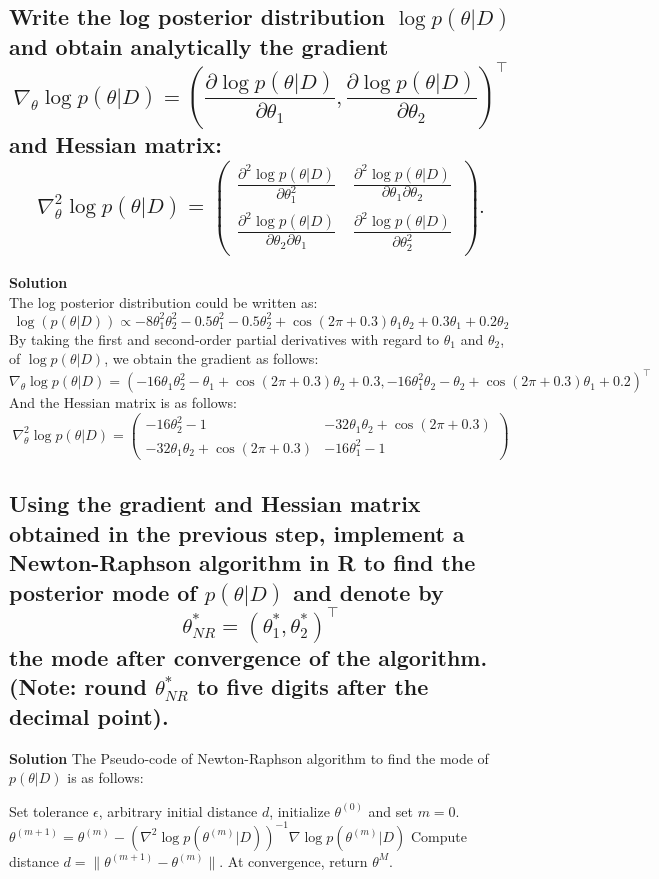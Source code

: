 \documentclass[12pt]{article}
\begin{document}
\subsection{Write the log posterior distribution \( \log p(\theta|D) \) and obtain analytically the gradient
\[\nabla_\theta \log p(\theta|D) = \left( \frac{\partial \log p(\theta|D)}{\partial \theta_1}, \frac{\partial \log p(\theta|D)}{\partial \theta_2} \right)^\top \]
and Hessian matrix:
\[\nabla^2_\theta \log p(\theta|D) = 
\begin{pmatrix}
\frac{\partial^2 \log p(\theta|D)}{\partial \theta_1^2} & \frac{\partial^2 \log p(\theta|D)}{\partial \theta_1 \partial \theta_2} \\
\frac{\partial^2 \log p(\theta|D)}{\partial \theta_2 \partial \theta_1} & \frac{\partial^2 \log p(\theta|D)}{\partial \theta_2^2} 
\end{pmatrix}.\]}
\textbf{Solution}\\
The log posterior distribution could be written as:
\[
\log(p(\theta|D)) \propto -8\theta_1^2\theta_2^2 - 0.5\theta_1^2 - 0.5\theta_2^2 + \cos(2\pi + 0.3)\theta_1\theta_2 + 0.3\theta_1 + 0.2\theta_2
\]
By taking the first and second-order partial derivatives with regard to \(\theta_1\) and \(\theta_2\), of \(\log p(\theta|D)\),
we obtain the gradient as follows:
\[
\nabla_\theta \log p(\theta|D) = \left( -16\theta_1\theta_2^2 - \theta_1 + \cos(2\pi + 0.3)\theta_2 + 0.3, -16\theta_1^2\theta_2 - \theta_2 + \cos(2\pi + 0.3)\theta_1 + 0.2 \right)^\top
\]
And the Hessian matrix is as follows:
\[
\nabla^2_\theta \log p(\theta|D) = 
\begin{pmatrix}
-16\theta_2^2 - 1 & -32\theta_1\theta_2 + \cos(2\pi + 0.3) \\
-32\theta_1\theta_2 + \cos(2\pi + 0.3) & -16\theta_1^2 - 1
\end{pmatrix}
\]

\subsection{Using the gradient and Hessian matrix obtained in the previous step, implement a Newton-Raphson algorithm in R to find the posterior mode of \( p(\theta|D) \) and denote by
\[
\theta^*_{NR} = (\theta^*_1, \theta^*_2)^\top
\]
the mode after convergence of the algorithm. (Note: round \( \theta^*_{NR} \) to five digits after the decimal point).}
\textbf{Solution}
The Pseudo-code of Newton-Raphson algorithm to find the mode of \( p(\theta|D) \) is as follows:

\begin{algorithm}
\begin{algorithmic}[1]
\State Set tolerance \( \epsilon \), arbitrary initial distance \( d \), initialize \( \theta^{(0)} \) and set \( m = 0 \).
    \State \( \theta^{(m+1)} = \theta^{(m)} - \left( \nabla^2 \log p(\theta^{(m)}|D) \right)^{-1} \nabla \log p(\theta^{(m)}|D) \)
    \State Compute distance \( d = \|\theta^{(m+1)} - \theta^{(m)}\| \).
\EndWhile
\State At convergence, return \( \theta^M \).
\end{algorithmic}
\end{algorithm}
\end{document}
